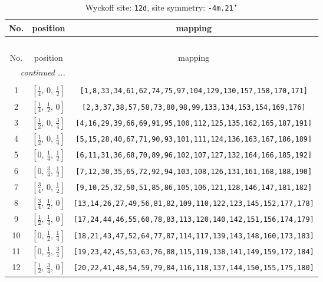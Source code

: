 \documentclass[fleqn,8pt]{jsarticle}
\begin{document}
\begin{longtable}{ccc}
\caption{Wyckoff site: {\tt 12d}, site symmetry: {\tt -4m.21'}}
 \\
 \hline \hline
No. & position & mapping \\ \hline \endfirsthead

\multicolumn{2}{l}{\tablename\ \thetable{}} \\
 \hline \hline
No. & position & mapping \\ \hline \endhead

 \hline \hline
\multicolumn{2}{r}{\footnotesize\it continued ...} \\ \endfoot

 \hline \hline
\multicolumn{2}{r}{} \\ \endlastfoot

1 & $\left[ \frac{1}{4},\, 0,\, \frac{1}{2} \right]$ & {\tt [1,8,33,34,61,62,74,75,97,104,129,130,157,158,170,171]} \\ \hline
2 & $\left[ \frac{1}{4},\, \frac{1}{2},\, 0 \right]$ & {\tt [2,3,37,38,57,58,73,80,98,99,133,134,153,154,169,176]} \\ \hline
3 & $\left[ \frac{1}{2},\, 0,\, \frac{3}{4} \right]$ & {\tt [4,16,29,39,66,69,91,95,100,112,125,135,162,165,187,191]} \\ \hline
4 & $\left[ \frac{1}{2},\, 0,\, \frac{1}{4} \right]$ & {\tt [5,15,28,40,67,71,90,93,101,111,124,136,163,167,186,189]} \\ \hline
5 & $\left[ 0,\, \frac{1}{4},\, \frac{1}{2} \right]$ & {\tt [6,11,31,36,68,70,89,96,102,107,127,132,164,166,185,192]} \\ \hline
6 & $\left[ 0,\, \frac{3}{4},\, \frac{1}{2} \right]$ & {\tt [7,12,30,35,65,72,92,94,103,108,126,131,161,168,188,190]} \\ \hline
7 & $\left[ \frac{3}{4},\, 0,\, \frac{1}{2} \right]$ & {\tt [9,10,25,32,50,51,85,86,105,106,121,128,146,147,181,182]} \\ \hline
8 & $\left[ \frac{3}{4},\, \frac{1}{2},\, 0 \right]$ & {\tt [13,14,26,27,49,56,81,82,109,110,122,123,145,152,177,178]} \\ \hline
9 & $\left[ \frac{1}{2},\, \frac{1}{4},\, 0 \right]$ & {\tt [17,24,44,46,55,60,78,83,113,120,140,142,151,156,174,179]} \\ \hline
10 & $\left[ 0,\, \frac{1}{2},\, \frac{1}{4} \right]$ & {\tt [18,21,43,47,52,64,77,87,114,117,139,143,148,160,173,183]} \\ \hline
11 & $\left[ 0,\, \frac{1}{2},\, \frac{3}{4} \right]$ & {\tt [19,23,42,45,53,63,76,88,115,119,138,141,149,159,172,184]} \\ \hline
12 & $\left[ \frac{1}{2},\, \frac{3}{4},\, 0 \right]$ & {\tt [20,22,41,48,54,59,79,84,116,118,137,144,150,155,175,180]} \\
\end{longtable}
\end{document}
